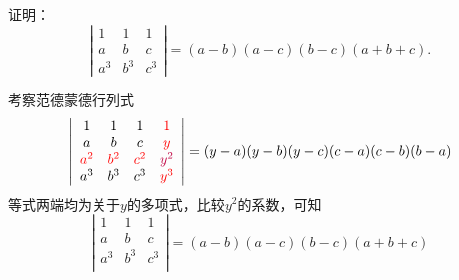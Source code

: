 \begin{frame}
  \begin{footnotesize}
    \begin{exampleblock}{21}
      证明：
      $$
      \left|
      \begin{array}{ccc}
        1   &   1   &   1\\
        a   &   b   &   c\\
        a^3 &   b^3 &   c^3
      \end{array}
      \right| = (a-b)(a-c)(b-c)(a+b+c).
      $$
    \end{exampleblock}
    \pause
    \proofname
    考察范德蒙德行列式
    $$
    \left|
    \begin{array}{cccc}
      1   &   1   &   1   & \textcolor{red}{1}\\
      a   &   b   &   c   & \textcolor{red}{y}\\
      \textcolor{red}{a^2} &   \textcolor{red}{b^2} &   \textcolor{red}{c^2} & \textcolor{purple}{y^2}\\
      a^3 &   b^3 &   c^3 & \textcolor{red}{y^3}\\
    \end{array}
    \right|
    = (y-a)(y-b)(y-c)(c-a)(c-b)(b-a)
    $$
    \pause
    等式两端均为关于$y$的多项式，比较$y^2$的系数，可知
    $$
    \left|
    \begin{array}{cccc}
      1   &   1   &   1  \\ 
      a   &   b   &   c  \\
      a^3 &   b^3 &   c^3\\
    \end{array}
    \right| = (a-b)(a-c)(b-c)(a+b+c)
    $$

  \end{footnotesize}
\end{frame}

